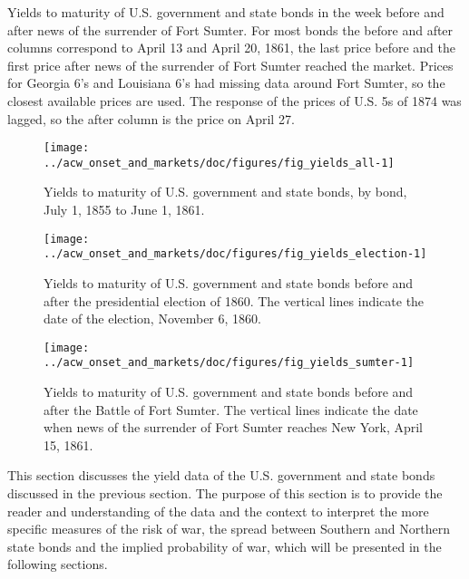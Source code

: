 \begin{table}
  \centering
  

\caption[Yields of U.S. government and state bonds around the Battle of Fort Sumter]{Yields to maturity of U.S. government and state bonds in the week before and after news of the surrender of Fort Sumter.
  For most bonds the before and after columns correspond to April 13 and April 20, 1861, the last price before and the first price after news of the surrender of Fort Sumter reached the market.
  Prices for Georgia 6's and Louisiana 6's had missing data around Fort Sumter, so the closest available prices are used.
  The response of the prices of U.S. 5s of 1874 was lagged, so the after column is the price on April 27.}
\label{acw_onset:tab:sumter}

\end{table}

\begin{figure}
  \centering
  \texttt{[image: ../acw\_onset\_and\_markets/doc/figures/fig\_yields\_all-1]}
\caption[Yields on U.S. government and state bonds, July  1, 1855--June  1, 1861] {Yields to maturity of U.S. government and state bonds, by bond, July  1, 1855 to June  1, 1861.}
\label{acw_onset:fig:yields_all}
\end{figure}


\begin{figure}
  \centering
  \texttt{[image: ../acw\_onset\_and\_markets/doc/figures/fig\_yields\_election-1]}
\caption[Yields on U.S. government and state bonds around the election of 1860]{Yields to maturity of U.S. government and state bonds before and after the presidential election of 1860.
  The vertical lines indicate the date of the election, November 6, 1860.}
\label{acw_onset:fig:yields_election}
\end{figure}

\begin{figure}
  \centering
  \texttt{[image: ../acw\_onset\_and\_markets/doc/figures/fig\_yields\_sumter-1]}
\caption[Yields of U.S. government and state bonds around the Battle of Fort Sumter]{Yields to maturity of U.S. government and state bonds before and after the Battle of Fort Sumter. The vertical lines indicate the date when news of the surrender of Fort Sumter reaches New York, April 15, 1861.}
\label{acw_onset:fig:yields_sumter}
\end{figure}

This section discusses the yield data of the U.S. government and state bonds discussed in the previous section.
The purpose of this section is to provide the reader and understanding of the data and the context to interpret the more specific measures of the risk of war, the spread between Southern and Northern state bonds and the implied probability of war, which will be presented in the following sections.

